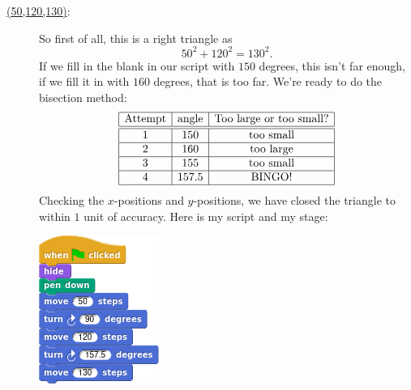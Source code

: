 \documentclass[noauthor,nooutcomes,handout,12pt]{ximera}
\begin{document}
\begin{question}
\begin{freeResponse}
\begin{description}
      \item[\underline{(50,120,130)}:] So first of all, this is a right
        triangle as
        \[
        50^2 + 120^2 =130^2.
        \]
        If we fill in the blank in our script with $150$ degrees, this
        isn't far enough, if we fill it in with $160$ degrees, that is
        too far. We're ready to do the bisection method:
        \[
        \begin{array}{|c|c|c|c|}\hline
          \text{Attempt} & \text{angle} & \text{Too large or too small?} \\ \hline\hline
          1 & 150 & \text{too small} \\ \hline
          2 & 160 & \text{too large}  \\ \hline
          3 & 155 & \text{too small}  \\ \hline
          4 & 157.5 & \text{BINGO!}  \\ \hline
        \end{array}
        \]
        Checking the $x$-positions and $y$-positions, we have closed
        the triangle to within $1$ unit of accuracy. Here is my script and my stage:
        \begin{center}
          \includegraphics[width=.3\textwidth]{50120130-script.png}   \qquad {}
        \end{center}




      




\end{description}
\end{freeResponse}
\end{question}
\end{document}
